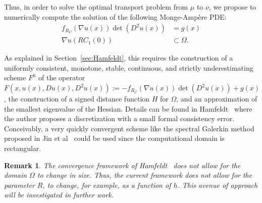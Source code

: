 \documentclass{amsart}
\theoremstyle{lemma}
\newtheorem{remark}[theorem]{Remark}
\theoremstyle{remark}
\begin{document}
Thus, in order to solve the optimal transport problem from $\mu$ to $\nu$, we propose to numerically compute the solution of the following Monge-Amp\`{e}re PDE:
\begin{align}
f_{R_{C}} (\nabla u(x)) \det (D^2 u(x)) &= g(x) \\
\nabla u(RC_{1}(0)) &\subset \Omega.
\end{align}

As explained in Section~\ref{sec:Hamfeldt}, this requires the construction of a uniformly consistent, monotone, stable, continuous, and strictly underestimating scheme $F^h$ of the operator $F(x,u(x), Du(x), D^2 u(x)):= -f_{R_{C}} (\nabla u(x)) \det (D^2 u(x)) +g(x)$, the construction of a signed distance function $H$ for $\Omega$, and an approximation of the smallest eigenvalue of the Hessian. Details can be found in Hamfeldt~\cite{HamfeldtBVP2} where the author proposes a discretization with a small formal consistency error. Conceivably, a very quickly convergent scheme like the spectral Galerkin method proposed in Jin et al~\cite{spectralgalerkin} could be used since the computational domain is rectangular.

\begin{remark}
The convergence framework of Hamfeldt~\cite{HamfeldtBVP2} does not allow for the domain $\Omega$ to change in size. Thus, the current framework does not allow for the parameter $R$, to change, for example, as a function of $h$. This avenue of approach will be investigated in further work.
\end{remark}
\end{document}
